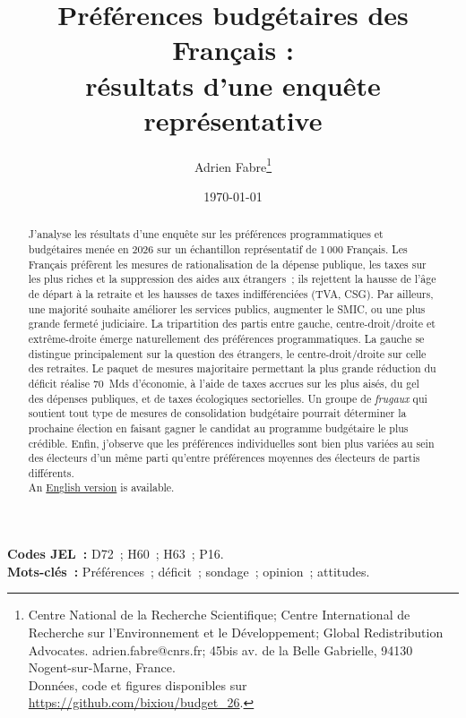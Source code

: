 \documentclass[12pt,french]{article}
\title{
  Préférences budgétaires des Français :\\ résultats d'une enquête représentative
}
\author{Adrien Fabre\thanks{Centre National de la Recherche Scientifique; Centre International de Recherche sur l'Environnement et le Développement; Global Redistribution Advocates. adrien.fabre@cnrs.fr; 45bis av. de la Belle Gabrielle, 94130 Nogent-sur-Marne, France. \\ 
Données, code et figures disponibles sur %
\url{https://github.com/bixiou/budget_26}.
}}
\date{\today}
\begin{document}
\maketitle


\begin{abstract} %
J'analyse les résultats d'une enquête sur les préférences programmatiques et budgétaires menée en 2026 sur un échantillon représentatif de 1\,000 Français. %
Les Français préfèrent les mesures de rationalisation de la dépense publique, les taxes sur les plus riches et la suppression des aides aux étrangers~; ils rejettent la hausse de l'âge de départ à la retraite et les hausses de taxes indifférenciées (TVA, CSG). Par ailleurs, une majorité souhaite %
améliorer les services publics, augmenter le SMIC, ou une plus grande fermeté judiciaire. La tripartition des partis entre gauche, centre-droit/droite et extrême-droite émerge naturellement des préférences programmatiques. La gauche se distingue principalement sur la question des étrangers, le centre-droit/droite sur celle des retraites. %
Le paquet de mesures majoritaire permettant la plus grande réduction du déficit réalise 70~Mds d'économie, à l'aide de taxes accrues sur les plus aisés, du gel des dépenses publiques, et de taxes écologiques sectorielles. Un groupe de \textit{frugaux} qui soutient tout type de mesures de consolidation budgétaire pourrait déterminer la prochaine élection en faisant gagner le candidat au programme budgétaire le plus crédible. 
Enfin, j'observe que les préférences individuelles sont bien plus variées au sein des électeurs d'un même parti qu'entre préférences moyennes des électeurs de partis différents. \\
An \href{https://github.com/bixiou/budget_26/raw/main/papers/budget_en.pdf}{English version} is available. %
\end{abstract}
\textbf{ %
Codes JEL~:} D72~; H60~; H63~; P16.\\
\textbf{Mots-clés~:} Préférences~; déficit~; sondage~; opinion~; attitudes.
\end{document}
